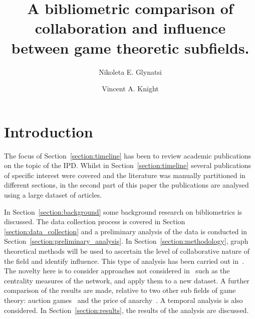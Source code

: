 \documentclass{article}
\title{A bibliometric comparison of collaboration and influence between game theoretic subfields.}
\author[1]{Nikoleta E. Glynatsi}
\author[1]{Vincent A. Knight}
\affil[1]{Cardiff University, School of Mathematics, Cardiff, United Kingdom}
\date{}
\theoremstyle{definition}
\begin{document}
\maketitle

\begin{abstract}


\end{abstract}

\section{Introduction}\label{section:introduction}

The focus of Section~\ref{section:timeline} has been to review academic
publications on the topic of the IPD. Whilst in
Section~\ref{section:timeline} several publications of specific interest were
covered and the literature was manually partitioned in different sections, in
the second part of this paper the publications are analysed using a large
dataset of articles.

In Section~\ref{section:background} some background research on bibliometrics is
discussed. The data collection process is covered in Section
\ref{section:data_collection} and a preliminary analysis of the data is
conducted in Section~\ref{section:preliminary_analysis}. In
Section~\ref{section:methodology}, graph theoretical methods will be used to
ascertain the level of collaborative nature of the field and identify influence.
This type of analysis has been carried out in~\cite{Liu2015}. The novelty here
is to consider approaches not considered in~\cite{Liu2015} such as the
centrality measures of the network, and apply them to a new dataset. A further
comparison of the results are made, relative to two other sub fields of game
theory: auction games~\cite{menezes2005} and the price of
anarchy~\cite{roughgarden2005}. A temporal analysis is also considered. In
Section~\ref{section:results}, the results of the analysis are discussed.
\end{document}

